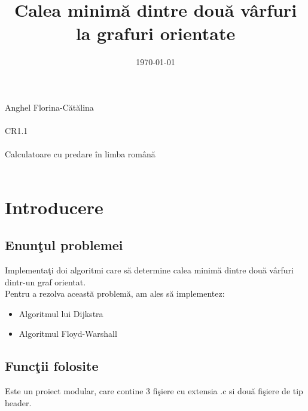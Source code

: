 \documentclass{article}
\begin{document}
\title{\huge{Calea minim\u{a} dintre dou\u{a} v\^{a}rfuri la grafuri orientate}}
\date{\Large{\today}}
\maketitle
\begin{center}
\vspace{30 mm}

\begin{tabbing}
 {\huge{Anghel Florina-C\u{a}t\u{a}lina} }\\
\\\vspace{10 mm}
 {\huge{CR1.1} }\\
\\\vspace{10 mm}
 {\huge{Calculatoare cu predare \^{i}n limba rom\^{a}n\u{a}}}\\
\\\vspace{10 mm}


\end{tabbing}
\end{center}
\clearpage


\section{Introducere}
\subsection{Enun\c{t}ul problemei}
Implementa\c{t}i doi algoritmi care s\u{a} determine calea minim\u{a} dintre dou\u{a} v\^{a}rfuri dintr-un graf orientat. 
\\Pentru a rezolva aceast\u{a} problem\u{a}, am ales s\u{a} implementez:
\begin{itemize}
    \item Algoritmul lui Dijkstra
    \item Algoritmul Floyd-Warshall
\end{itemize}

\subsection{Func\c{t}ii folosite}
Este un proiect modular, care contine 3 fi\c{s}iere cu extensia .c si dou\u{a} fi\c{s}iere de tip header. 
\end{document}
